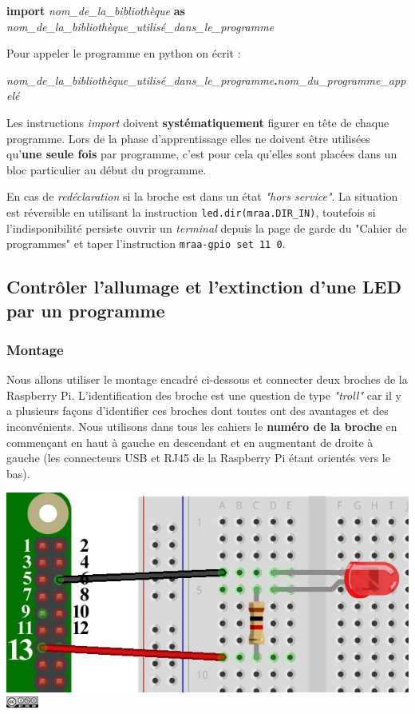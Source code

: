 \documentclass[11pt]{article}
\makeatletter
\def\maxwidth{\ifdim\Gin@nat@width>\linewidth\linewidth
    \else\Gin@nat@width\fi}
\let\Oldincludegraphics\includegraphics
\renewcommand{\includegraphics}[1]{\Oldincludegraphics[width=.8\maxwidth]{#1}}
\makeatother
\begin{document}
\textbf{import} \emph{nom\_de\_la\_bibliothèque} \textbf{as}
\emph{nom\_de\_la\_bibliothèque\_utilisé\_dans\_le\_programme}

Pour appeler le programme en python on écrit :

\emph{nom\_de\_la\_bibliothèque\_utilisé\_dans\_le\_programme}\textbf{.}\emph{nom\_du\_programme\_appelé}

Les instructions \emph{import} doivent \textbf{systématiquement} figurer
en tête de chaque programme. Lors de la phase d'apprentissage elles ne
doivent être utilisées qu'\textbf{une seule fois} par programme, c'est
pour cela qu'elles sont placées dans un bloc particulier au début du
programme.

En cas de \emph{redéclaration} si la broche est dans un état \emph{"hors
service"}. La situation est réversible en utilisant la instruction
\texttt{led.dir(mraa.DIR\_IN)}, toutefois si l'indisponibilité persiste
ouvrir un \emph{terminal} depuis la page de garde du "Cahier de
programmes" et taper l'instruction \texttt{mraa-gpio\ set\ 11\ 0}.

    \subsection{Contrôler l'allumage et l'extinction d'une LED par un
programme}\label{contruxf4ler-lallumage-et-lextinction-dune-led-par-un-programme}

\subsubsection{Montage}\label{montage}

Nous allons utiliser le montage encadré ci-dessous et connecter deux
broches de la Raspberry Pi. L'identification des broche est une question
de type \emph{"troll"} car il y a plusieurs façons d'identifier ces
broches dont toutes ont des avantages et des inconvénients. Nous
utilisons dans tous les cahiers le \textbf{numéro de la broche} en
commençant en haut à gauche en descendant et en augmentant de droite à
gauche (les connecteurs USB et RJ45 de la Raspberry Pi étant orientés
vers le bas).

\includegraphics{images/RaspberryPi_Led_Detail.jpg}
\includegraphics{images/Licence.jpg}
\end{document}
